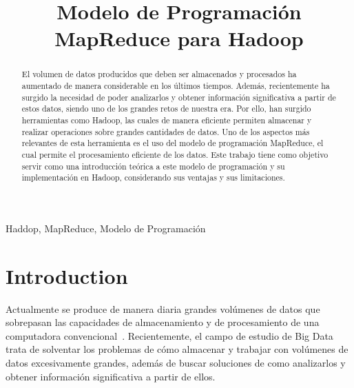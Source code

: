 \documentclass[conference]{IEEEtran}
\begin{document}
\title{Modelo de Programación MapReduce para Hadoop}

\author{
}

\maketitle

\begin{abstract}
El volumen de datos producidos que deben ser almacenados y procesados ha aumentado de manera considerable en los últimos tiempos.
Además, recientemente ha surgido la necesidad de poder analizarlos y obtener información significativa a partir de estos datos, siendo uno de los grandes retos de nuestra era.
Por ello, han surgido herramientas como Hadoop, las cuales de manera eficiente permiten almacenar y realizar operaciones sobre grandes cantidades de datos.
Uno de los aspectos más relevantes de esta herramienta es el uso del modelo de programación MapReduce, el cual permite el procesamiento eficiente de los datos.
Este trabajo tiene como objetivo servir como una introducción teórica a este modelo de programación y su implementación en Hadoop, considerando sus ventajas y sus limitaciones.
\end{abstract}



\begin{IEEEkeywords}
Haddop, MapReduce, Modelo de Programación
\end{IEEEkeywords}



\section{Introduction}
\label{intro}

Actualmente se produce de manera diaria grandes volúmenes de datos que sobrepasan las capacidades de almacenamiento y de procesamiento de una computadora convencional~\cite{Holmes12}.
Recientemente, el campo de estudio de Big Data trata de solventar los problemas de cómo almacenar y trabajar con volúmenes de datos excesivamente grandes, además de buscar soluciones de como analizarlos y obtener información significativa a partir de ellos.
\end{document}
